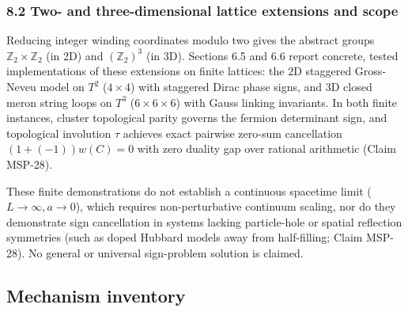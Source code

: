 \documentclass[
  11pt,
]{article}
\begin{document}
\subsubsection{8.2 Two- and three-dimensional lattice extensions and
scope}\label{two--and-three-dimensional-lattice-extensions-and-scope}

Reducing integer winding coordinates modulo two gives the abstract
groups \(\mathbb{Z}_2 \times \mathbb{Z}_2\) (in 2D) and
\((\mathbb{Z}_2)^3\) (in 3D). Sections 6.5 and 6.6 report concrete,
tested implementations of these extensions on finite lattices: the 2D
staggered Gross-Neveu model on \(T^2\) (\(4 \times 4\)) with staggered
Dirac phase signs, and 3D closed meron string loops on \(T^3\)
(\(6 \times 6 \times 6\)) with Gauss linking invariants. In both finite
instances, cluster topological parity governs the fermion determinant
sign, and topological involution \(\tau\) achieves exact pairwise
zero-sum cancellation \((1 + (-1)) w(C) = 0\) with zero duality gap over
rational arithmetic (Claim MSP-28).

These finite demonstrations do not establish a continuous spacetime
limit (\(L \to \infty, a \to 0\)), which requires non-perturbative
continuum scaling, nor do they demonstrate sign cancellation in systems
lacking particle-hole or spatial reflection symmetries (such as doped
Hubbard models away from half-filling; Claim MSP-28). No general or
universal sign-problem solution is claimed.

\subsection{Mechanism inventory}\label{mechanism-inventory}
\end{document}
